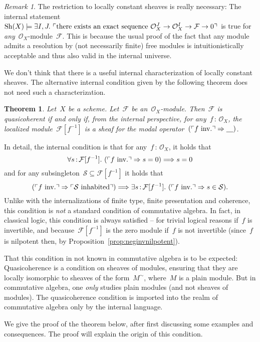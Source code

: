 \documentclass[10pt,reqno,a4paper]{amsbook}
\makeatletter
\theoremstyle{definition}
\theoremstyle{plain}
\newtheorem{thm}[defn]{Theorem}
\theoremstyle{remark}
\newtheorem{rem}[defn]{Remark}
\newcommand{\F}{\mathcal{F}}
\renewcommand{\O}{\mathcal{O}}
\renewcommand{\S}{\mathcal{S}}
\newcommand{\placeholder}{\underline{\quad}}
\newcommand{\Sh}{\mathrm{Sh}}
\newcommand{\?}{\,{:}\,}
\renewcommand{\_}{\mathpunct{.}\,}
\newcommand{\speak}[1]{\ulcorner\text{\textnormal{#1}}\urcorner}
\newcommand{\inv}{inv.\@}
\makeatother
\begin{document}
\begin{rem}The restriction to locally constant sheaves is really necessary: The
internal statement~$\Sh(X) \models \exists I,J\_ \speak{there exists an
exact sequence~$\O_X^J \to \O_X^I \to \F \to 0$}$ is true for
\emph{any}~$\O_X$-module~$\F$. This is because the usual proof of the fact that
any module admits a resolution by (not necessarily finite) free modules is
intuitionistically acceptable and thus also valid in the internal
universe.\end{rem}

We don't think that there is a useful internal characterization of
locally constant sheaves. The alternative internal condition given by the following
theorem does not need such a characterization.

\begin{thm}\label{thm:qcoh-sheafchar}
Let~$X$ be a scheme. Let~$\F$ be an~$\O_X$-module. Then~$\F$ is
quasicoherent if and only if, from the internal perspective, for any~$f\?\O_X$,
the localized module~$\F[f^{-1}]$ is a sheaf for the modal operator~$(\speak{$f$ \inv}
\Rightarrow \placeholder)$.
\end{thm}

In detail, the internal condition is that for any~$f\?\O_X$, it holds that
\[ \forall s\?\F[f^{-1}]\_
  (\speak{$f$ \inv} \Rightarrow s = 0) \Longrightarrow s = 0 \]
and for any subsingleton~$\S \subseteq \F[f^{-1}]$ it holds that
\[ (\speak{$f$ \inv} \Rightarrow \speak{$\S$ inhabited}) \Longrightarrow
  \exists s\?\F[f^{-1}]\_
  (\speak{$f$ \inv} \Rightarrow s \in \S). \]
Unlike with the internalizations of finite type, finite presentation and
coherence, this condition is \emph{not} a standard condition of commutative
algebra. In fact, in classical logic, this condition is always satisfied --
for trivial logical reasons if~$f$ is invertible, and because~$\F[f^{-1}]$ is
the zero module if~$f$ is not invertible (since~$f$ is nilpotent then, by
Proposition~\ref{prop:neginvnilpotent}).

That this condition in not known in commutative algebra is to be expected:
Quasicoherence is a condition on sheaves of modules, ensuring
that they are locally isomorphic to sheaves of the form~$M^\sim$,
where~$M$ is a plain module. But in commutative algebra, one \emph{only} studies plain
modules (and not sheaves of modules). The quasicoherence condition is imported
into the realm of commutative algebra only by the internal language.

We give the proof of the theorem below, after first discussing some examples
and consequences. The proof will explain the origin of this condition.
\end{document}

